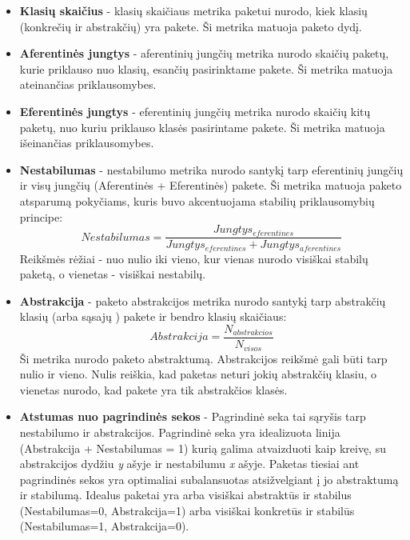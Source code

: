 \begin{itemize}
    \item \textbf{Klasių skaičius} - klasių skaičiaus metrika paketui nurodo, kiek klasių (konkrečių ir abstrakčių) yra pakete.
    Ši metrika matuoja paketo dydį.
    \item \textbf{Aferentinės jungtys } - aferentinių jungčių metrika nurodo
    skaičių paketų, kurie priklauso nuo klasių, esančių pasirinktame pakete.
    Ši metrika matuoja ateinančias priklausomybes.
    \item \textbf{Eferentinės jungtys } - eferentinių jungčių metrika nurodo skaičių kitų paketų,
    nuo kuriu priklauso klasės pasirintame pakete.
    Ši metrika matuoja išeinančias priklausomybes.
    \item \textbf{Nestabilumas} - nestabilumo metrika nurodo santykį tarp eferentinių jungčių ir
    visų jungčių (Aferentinės + Eferentinės) pakete.
    Ši metrika matuoja paketo atsparumą pokyčiams, kuris buvo akcentuojama stabilių priklausomybių principe:
    \begin{equation}
        Nestabilumas=\frac{Jungtys_{eferentines}}{Jungtys_{eferentines} + Jungtys_{aferentines}}
    \end{equation}
    Reikšmės rėžiai - nuo nulio iki vieno, kur vienas nurodo visiškai stabilų paketą, o vienetas - visiškai nestabilų.
    \item \textbf{Abstrakcija} - paketo abstrakcijos metrika nurodo santykį tarp abstrakčių klasių (arba sąsajų ) pakete ir bendro klasių skaičiaus:
    \begin{equation}
        Abstrakcija=\frac{N_{abstrakcios}}{N_{visos}}
    \end{equation}
    Ši metrika nurodo paketo abstraktumą.
    Abstrakcijos reikšmė gali būti tarp nulio ir vieno.
    Nulis reiškia, kad paketas neturi jokių abstrakčių klasiu, o vienetas nurodo, kad pakete yra tik abstrakčios klasės.
    \item \textbf{Atstumas nuo pagrindinės sekos} -
    Pagrindinė seka tai sąryšis tarp nestabilumo ir abstrakcijos.
    Pagrindinė seka yra idealizuota linija (Abstrakcija + Nestabilumas = 1)  kurią galima atvaizduoti kaip kreivę, su abstrakcijos dydžiu \textit{y} ašyje ir nestabilumu \textit{x} ašyje.
    Paketas tiesiai ant pagrindinės sekos yra optimaliai subalansuotas atsižvelgiant į jo abstraktumą ir stabilumą.
    Idealus paketai yra arba visiškai abstraktūs ir stabilus (Nestabilumas=0, Abstrakcija=1) arba visiškai konkretūs ir stabilūs (Nestabilumas=1, Abstrakcija=0).

\end{itemize}
